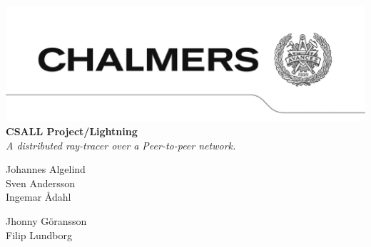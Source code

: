 \begin{titlepage}
\hspace*{-126pt}
\setlength{\voffset}{-129pt}
\enlargethispage{200pt}
\includegraphics[width=\paperwidth,keepaspectratio=true]{img/avancez.png}
\vspace*{130pt}\\
{\Huge\textbf{CSALL Project/Lightning}}
\vspace*{50pt}\\
\textit{A distributed ray-tracer over a Peer-to-peer network.}
\vspace*{30pt}\\
\begin{minipage}{0.4\textwidth}
\begin{flushleft}
Johannes Algelind\\
Sven Andersson\\
Ingemar Ådahl\\
\end{flushleft}
\end{minipage}
\begin{minipage}{0.4\textwidth}
\begin{flushleft}
Jhonny Göransson\\
Filip Lundborg\\
\mbox{ }\\
\end{flushleft}
\end{minipage}\\
\vspace*{110pt}\\
\end{titlepage}


